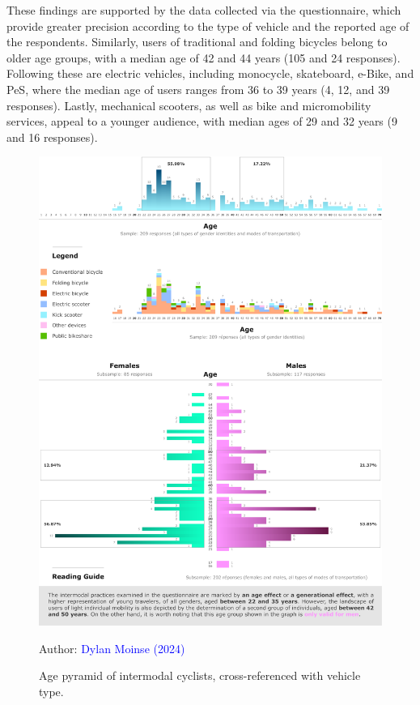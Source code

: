 \begin{refsegment}
These findings are supported by the data collected via the questionnaire, which provide greater precision according to the type of vehicle and the reported age of the respondents. Similarly, users of traditional and folding bicycles belong to older age groups, with a median age of 42 and 44 years (105 and 24 responses). Following these are electric vehicles, including monocycle, skateboard, \acrshort{e-Bike}, and \acrshort{PeS}, where the median age of users ranges from 36 to 39 years (4, 12, and 39 responses). Lastly, mechanical scooters, as well as bike and micromobility services, appeal to a younger audience, with median ages of 29 and 32 years (9 and 16 responses).%

    \begin{figure}[h!]\vspace*{4pt}
        \caption{Age pyramid of intermodal cyclists, cross-referenced with vehicle type.}
        \label{fig-chap4:pyramide-age}
        \centerline{\includegraphics[width=1\columnwidth]{src/Figures/Chap-4/EN_Pyramide_age.pdf}}
        \vspace{5pt}
        \begin{flushright}\scriptsize{
        Author: \textcolor{blue}{Dylan Moinse (2024)}
        }\end{flushright}
    \end{figure}


\end{refsegment}
